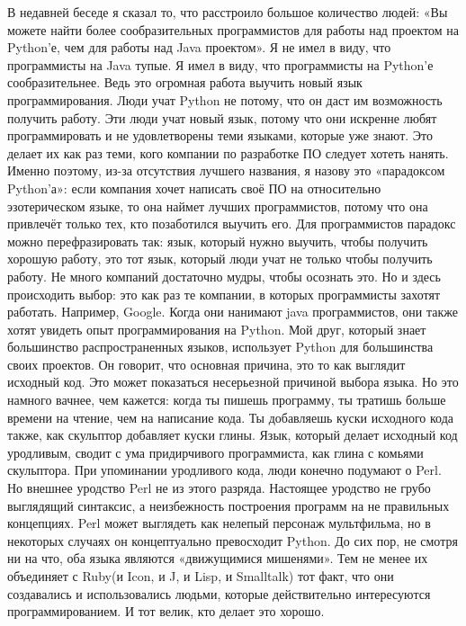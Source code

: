 \documentclass[ebook,12pt,oneside,openany]{memoir}
\begin{document}
\maketitle

В недавней беседе я сказал то, что расстроило большое количество
людей: «Вы можете найти более сообразительных программистов для работы
над проектом на Python’е, чем для работы над Java проектом». Я не имел
в виду, что программисты на Java тупые. Я имел в виду, что
программисты на Python’е сообразительнее. Ведь это огромная работа
выучить новый язык программирования. Люди учат Python не потому, что
он даст им возможность получить работу. Эти люди учат новый язык,
потому что они искренне любят программировать и не удовлетворены теми
языками, которые уже знают. Это делает их как раз теми, кого компании
по разработке ПО следует хотеть нанять. Именно поэтому, из-за
отсутствия лучшего названия, я назову это «парадоксом Python’а»: если
компания хочет написать своё ПО на относительно эзотерическом языке,
то она наймет лучших программистов, потому что она привлечёт только
тех, кто позаботился выучить его. Для программистов парадокс можно
перефразировать так: язык, который нужно выучить, чтобы получить
хорошую работу, это тот язык, который люди учат не только чтобы
получить работу. Не много компаний достаточно мудры, чтобы осознать
это. Но и здесь происходить выбор: это как раз те компании, в которых
программисты захотят работать. Например, Google. Когда они нанимают
java программистов, они также хотят увидеть опыт программирования на
Python. Мой друг, который знает большинство распространенных языков,
использует Python для большинства своих проектов. Он говорит, что
основная причина, это то как выглядит исходный код. Это может
показаться несерьезной причиной выбора языка. Но это намного вачнее,
чем кажется: когда ты пишешь программу, ты тратишь больше времени на
чтение, чем на написание кода. Ты добавляешь куски исходного кода
также, как скульптор добавляет куски глины. Язык, который делает
исходный код уродливым, сводит с ума придирчивого программиста, как
глина с комьями скульптора. При упоминании уродливого кода, люди
конечно подумают о Perl. Но внешнее уродство Perl не из этого разряда.
Настоящее уродство не грубо выглядящий синтаксис, а неизбежность
построения программ на не правильных концепциях. Perl может выглядеть
как нелепый персонаж мультфильма, но в некоторых случаях он
концептуально превосходит Python. До сих пор, не смотря ни на что, оба
языка являются «движущимися мишенями». Тем не менее их объединяет с
Ruby(и Icon, и J, и Lisp, и Smalltalk) тот факт, что они создавались и
использовались людьми, которые действительно интересуются
программированием. И тот велик, кто делает это хорошо.
\end{document}
